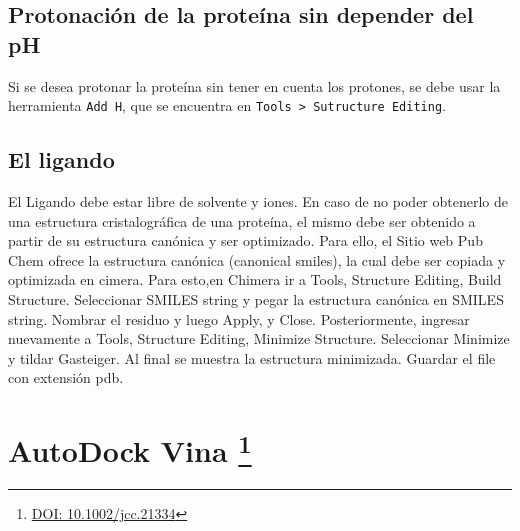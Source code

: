 	\subsection{Protonación de la proteína sin depender del pH}
		Si se desea protonar la proteína sin tener en cuenta los protones, se debe usar la herramienta \texttt{Add H}, que se encuentra en \texttt{Tools >\ Sutructure Editing}.\par
		
\subsection{El ligando}\label{preparacion_ligando}
	El Ligando debe estar libre de solvente y iones. En caso de no poder obtenerlo de una estructura cristalográfica de una proteína, el mismo debe ser obtenido a partir de su estructura canónica y ser optimizado. Para ello, el Sitio web Pub Chem ofrece la estructura canónica (canonical smiles), la cual debe ser copiada y optimizada en cimera. Para esto,en Chimera ir a Tools, Structure Editing, Build Structure. Seleccionar SMILES string y pegar la estructura canónica en SMILES string. Nombrar el residuo y luego Apply, y Close. Posteriormente, ingresar nuevamente a Tools, Structure Editing, Minimize Structure. Seleccionar Minimize y tildar Gasteiger. Al final se muestra la estructura minimizada. Guardar el file con extensión pdb.

\section[AutoDock Vina]{AutoDock Vina \footnote{\href{http://www3.interscience.wiley.com/journal/122439542/abstract}{DOI: 10.1002/jcc.21334}}}


